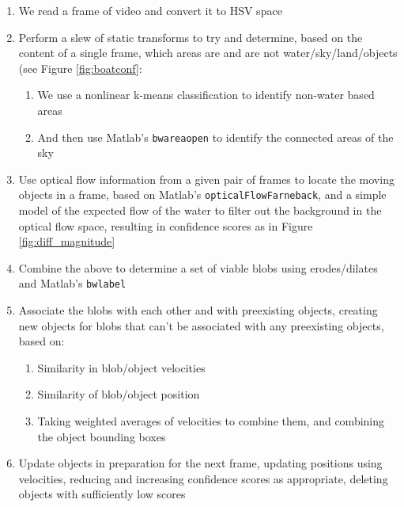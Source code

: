 \documentclass{article}
\begin{document}
\begin{enumerate}
\item We read a frame of video and convert it to HSV space
\item Perform a slew of static transforms to try and determine,
      based on the content of a single frame, which areas are and
      are not water/sky/land/objects (see Figure \ref{fig:boatconf}:
  \begin{enumerate}
    \item We use a nonlinear k-means classification to
          identify non-water based areas
    \item And then use Matlab's \texttt{bwareaopen} to
          identify the connected areas of the sky
  \end{enumerate}
\item Use optical flow information from a given pair of frames to
      locate the moving objects in a frame, based on Matlab's
      \texttt{opticalFlowFarneback}, and a simple model of the
      expected flow of the water to filter out the background in
      the optical flow space, resulting in confidence scores
      as in Figure \ref{fig:diff_magnitude}
\item Combine the above to determine a set of viable blobs using erodes/dilates
      and Matlab's \texttt{bwlabel}
\item Associate the blobs with each other and with preexisting objects,
      creating new objects for blobs that can't be associated with any
      preexisting objects, based on:
  \begin{enumerate}
    \item Similarity in blob/object velocities
    \item Similarity of blob/object position
    \item Taking weighted averages of velocities to combine them, and
          combining the object bounding boxes
  \end{enumerate}
\item Update objects in preparation for the next frame, updating
      positions using velocities, reducing and increasing confidence
      scores as appropriate, deleting objects with sufficiently low
      scores
\end{enumerate}
\end{document}
